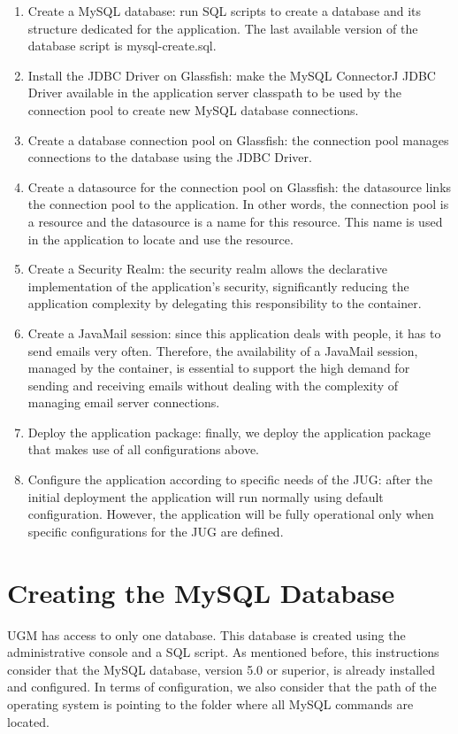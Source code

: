 \documentclass[envcountsame,envcountchap]{svmono}
\begin{document}
\begin{enumerate}
\item Create a MySQL database: run SQL scripts to create a database and its structure dedicated for the application. The last available version of the database script is mysql-create.sql.
\item Install the JDBC Driver on Glassfish: make the MySQL ConnectorJ JDBC Driver available in the application server classpath to be used by the connection pool to create new MySQL database connections.
\item Create a database connection pool on Glassfish: the connection pool manages connections to the database using the JDBC Driver.
\item Create a datasource for the connection pool on Glassfish: the datasource links the connection pool to the application. In other words, the connection pool is a resource and the datasource is a name for this resource. This name is used in the application to locate and use the resource.
\item Create a Security Realm: the security realm allows the declarative implementation of the application's security, significantly reducing the application complexity by delegating this responsibility to the container.
\item Create a JavaMail session: since this application deals with people, it has to send emails very often. Therefore, the availability of a JavaMail session, managed by the container, is essential to support the high demand for sending and receiving emails without dealing with the complexity of managing email server connections.
\item Deploy the application package: finally, we deploy the application package that makes use of all configurations above.
\item Configure the application according to specific needs of the JUG: after the initial deployment the application will run normally using default configuration. However, the application will be fully operational only when specific configurations for the JUG are defined.
\end{enumerate}

\section{Creating the MySQL Database}

UGM has access to only one database. This database is created using the administrative console and a SQL script. As mentioned before, this instructions consider that the MySQL database, version 5.0 or superior, is already installed and configured. In terms of configuration, we also consider that the path of the operating system is pointing to the folder where all MySQL commands are located.
\end{document}
